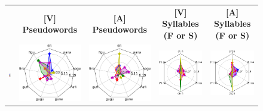 \hspace{-5ex}
\begin{figure}[ht]
\scriptsize
\hspace{0ex}
\begin{tabular}{lcccc}
{} & \textbf{\Large [V] Pseudowords} & \textbf{\Large [A] Pseudowords} & \textbf{\Large [V] Syllables (F or S)} & \textbf{\Large [A] Syllables (F or S)}\\
\hspace{-4ex}
{\includegraphics[width=.07\linewidth]{figures/part_II/subjects_legend.pdf}}
\hspace{-4ex}
&{\includegraphics[width=.23\linewidth]{figures/part_II/roi_plots/aSTS/Vis/radial_word.pdf}}
\hspace{-4ex}
&{\includegraphics[width=.23\linewidth]{figures/part_II/roi_plots/aSTS/Aud/radial_word.pdf}}
\hspace{-4ex}
&{\includegraphics[width=.23\linewidth]{figures/part_II/roi_plots/aSTS/Vis/radial_joint.pdf}}
\hspace{-4ex}
&{\includegraphics[width=.23\linewidth]{figures/part_II/roi_plots/aSTS/Aud/radial_joint.pdf}}

\end{tabular}
\end{figure}

